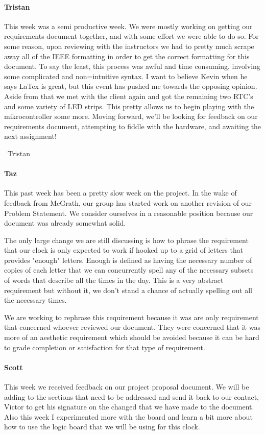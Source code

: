 \documentclass[onecolumn, draftclsnofoot,10pt, compsoc]{IEEEtran}
\begin{document}
\paragraph{Tristan}
This week was a semi productive week. We were mostly working on getting our requirements document together, and with some effort we were able to do so. For some reason, upon reviewing with the instructors we had to pretty much scrape away all of the IEEE formatting in order to get the correct formatting for this document. To say the least, this process was awful and time consuming, involving some complicated and non=intuitive syntax. I want to believe Kevin when he says LaTex is great, but this event has pushed me towards the opposing opinion. Aside from that we met with the client again and got the remaining two RTC's and some variety of LED strips. This pretty allows us to begin playing with the mikrocontroller some more. Moving forward, we'll be looking for feedback on our requirements document, attempting to fiddle with the hardware, and awaiting the next assignment!

~Tristan
\paragraph{Taz}
This past week has been a pretty slow week on the project. In the wake of feedback from McGrath, our group has started work on another revision of our Problem Statement. We consider ourselves in a reasonable position because our document was already somewhat solid.

The only large change we are still discussing is how to phrase the requirement that our clock is only expected to work if hooked up to a grid of letters that provides "enough" letters. Enough is defined as having the necessary number of copies of each letter that we can concurrently spell any of the necessary subsets of words that describe all the times in the day. This is a very abstract requirement but without it, we don't stand a chance of actually spelling out all the necessary times.

We are working to rephrase this requirement because it was are only requirement that concerned whoever reviewed our document. They were concerned that it was more of an aesthetic requirement which should be avoided because it can be hard to grade completion or satisfaction for that type of requirement.
\paragraph{Scott}
This week we received feedback on our project proposal document. We will be adding to the sections that need to be addressed and send it back to our contact, Victor to get his signature on the changed that we have made to the document. Also this week I experimented more with the board and learn a bit more about how to use the logic board that we will be using for this clock.
\end{document}
